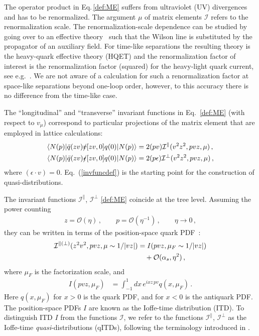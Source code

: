 \documentclass[aps,prd,twocolumn,a4paper,superscriptaddress,10pt,showpacs,notitlepage,floatfix]{revtex4-1}
\begin{document}
The operator product in Eq.\,\eqref{def:ME} suffers from ultraviolet (UV) divergences and has to be renormalized. The argument $\mu$ of matrix elements $\mathcal{I}$ refers to the renormalization scale. The renormalization-scale dependence can be studied by going over to an effective theory~\cite{Craigie:1980qs,Dorn:1986dt,Ji:2017oey} such that the Wilson line is substituted by the propagator of an auxiliary field. For time-like separations the resulting theory is  the heavy-quark effective theory (HQET) and the renormalization factor of interest is the renormalization factor (squared) for the heavy-light quark current, see e.g.~\cite{Chetyrkin:2003vi}. We are not aware of a calculation for such a renormalization factor at space-like separations beyond one-loop order, however, to this accuracy there is no difference from the time-like case. 


The ``longitudinal'' and ``transverse'' invariant functions in Eq.~\eqref{def:ME} (with respect to $v_\mu$) correspond to particular projections of the matrix element that are employed in lattice calculations: 
\begin{align}\label{invfuncdef}
 \langle N(p)| \bar q (zv) \slashed{v} [zv,0]q(0) |N(p)\rangle  & = 2 (pv) \mathcal{I}^\parallel (v^2z^2,pvz,\mu)\,,
\notag\\
  \langle N(p)| \bar q (zv) \slashed{\epsilon}[zv,0] q(0) |N(p)\rangle &= 2 (p\epsilon) \mathcal{I}^\perp (v^2z^2,pvz,\mu)\,,
\end{align}
where $(\epsilon\cdot v) =0$. Eq.~(\ref{invfuncdef}) is the starting point for the construction of quasi-distributions.
 
The invariant functions  $\mathcal{I}^{\parallel}$, $\mathcal{I}^{\perp}$ \eqref{def:ME}  coincide at the tree level.  Assuming the power counting \begin{align}
\label{power-counting}
  z = \mathcal{O}(\eta)\,, \qquad p = \mathcal{O}(\eta^{-1})\,,\qquad \eta \to 0\,, 
\end{align} 
they can be written in terms of the position-space quark PDF~\cite{Ioffe:1969kf,Braun:1994jq,Hoyer:1996nr}:
\begin{align}
  \mathcal{I}^{\parallel(\perp)}(z^2v^2,pvz, \mu\sim 1/|vz|) &=  I(pvz, \mu_F \sim 1/|vz|)
\notag\\&\quad
 +\mathcal{O}(\alpha_s, \eta^2)\,, 
\end{align}
where  $\mu_F$ is the factorization scale, and 
\begin{align}
\label{ITD}
   I(pvz,\mu_F) &=  \int_{-1}^1 dx \, e^{ixz\,pv} q(x,\mu_F)\,.
\end{align} 
Here $q(x,\mu_F)$ for $x>0$ is the quark PDF, and for $x<0$ is the antiquark PDF. The position-space PDFs $I$ are known as the Ioffe-time distribution (ITD). To distinguish ITD $I$ from the functions $\mathcal{I}$, we refer to the functions $\mathcal{I}^{\parallel}$, $\mathcal{I}^{\perp}$  as the Ioffe-time \emph{quasi}-distributions (qITDs), following the terminology introduced in \cite{Ji:2013dva}.
 
\end{document}
